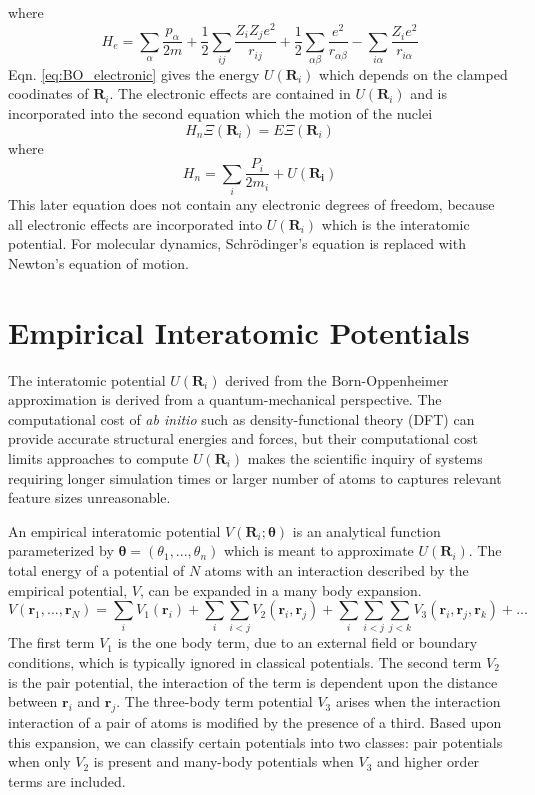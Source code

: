 where
\begin{equation}
	H_e = \sum_\alpha \frac{p_\alpha}{2m}
	      + \frac{1}{2} \sum_{ij} \frac{Z_i Z_j e^2}{r_{ij}}
	      + \frac{1}{2} \sum_{\alpha\beta} \frac{e^2}{r_{\alpha\beta}}
	      - \sum_{i\alpha} \frac{Z_i e^2}{r_{i\alpha}}
\end{equation}
Eqn. \ref{eq:BO_electronic} gives the energy $U(\bm{R}_i)$ which depends on the clamped coodinates of $\bm{R}_i$.  The electronic effects are contained in $U(\bm{R}_i)$ and is incorporated into the second equation which the motion of the nuclei
\begin{equation}
\label{eq:BO_nuclei}
    H_n\Xi(\bm{R}_i)=E\Xi(\bm{R}_i)
\end{equation}
where
\begin{equation}
\label{eq:H_n}
    H_n = \sum_i \frac{P_i}{2m_i} + U(\bm{R_i})
\end{equation}
This later equation does not contain any electronic degrees of freedom, because all electronic effects are incorporated into $U(\bm{R}_i)$ which is the interatomic potential.  For molecular dynamics, Schr\"{o}dinger's equation is replaced with Newton's equation of motion.
\section{Empirical Interatomic Potentials}
The interatomic potential $U(\bm{R}_i)$ derived from the Born-Oppenheimer approximation is derived from a quantum-mechanical perspective.  The computational cost of \emph{ab initio} such as density-functional theory (DFT) can provide accurate structural energies and forces, but their computational cost limits approaches to compute $U(\bm{R}_i)$ makes the scientific inquiry of systems requiring longer simulation times or larger number of atoms to captures relevant feature sizes unreasonable.

An empirical interatomic potential $V(\bm{R}_i;\bm{\theta})$ is an analytical function parameterized by $\bm{\theta}=(\theta_1,...,\theta_n)$ which is meant to approximate $U(\bm{R}_i)$.  The total energy of a potential of $N$ atoms with an interaction described by the empirical potential, $V$, can be expanded in a many body expansion.
\begin{equation}
	V(\bm{r}_1,...,\bm{r}_N)= \sum_i V_1(\bm{r}_i)
	                          + \sum_i \sum_{i<j} V_2(\bm{r}_i,\bm{r}_j)
				  + \sum_i \sum_{i<j} \sum_{j<k} V_3(\bm{r}_i,\bm{r}_j,\bm{r}_k) + ...
\end{equation}
The first term $V_1$ is the one body term, due to an external field or boundary conditions, which is typically ignored in classical potentials.  The second term $V_2$ is the pair potential, the interaction of the term is dependent upon the distance between $\bm{r}_i$ and $\bm{r}_j$.  The three-body term potential $V_3$ arises when the interaction interaction of a pair of atoms is modified by the presence of a third.  Based upon this expansion, we can classify certain potentials into two classes: pair potentials when only $V_2$ is present and many-body potentials when $V_3$ and higher order terms are included.
